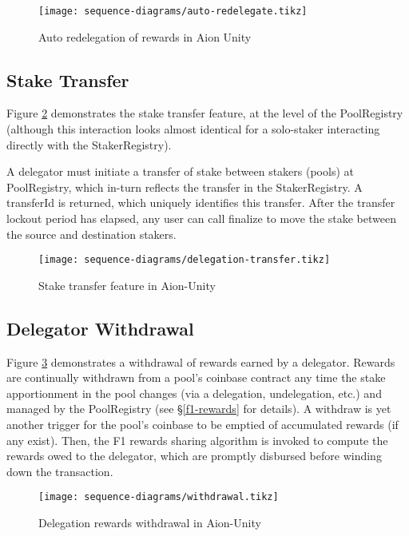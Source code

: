 \begin{figure}[ht]
\centering
\texttt{[image: sequence-diagrams/auto-redelegate.tikz]}
\caption{Auto redelegation of rewards in Aion Unity}
\label{fig:redelegation}
\end{figure}
\clearpage

\subsection{Stake Transfer}

Figure \ref{fig:delegation_transfer} demonstrates the stake transfer feature, at the level of the PoolRegistry (although this interaction looks almost identical for a solo-staker interacting directly with the StakerRegistry). 

A delegator must initiate a transfer of stake between stakers (pools) at PoolRegistry, which in-turn reflects the transfer in the StakerRegistry. A transferId is returned, which uniquely identifies this transfer. After the transfer lockout period has elapsed, any user can call finalize to move the stake between the source and destination stakers.

\begin{figure}[ht]
\centering
\texttt{[image: sequence-diagrams/delegation-transfer.tikz]}
\caption{Stake transfer feature in Aion-Unity}
\label{fig:delegation_transfer}
\end{figure}
\clearpage

\subsection{Delegator Withdrawal}

Figure \ref{fig:withdrawal} demonstrates a withdrawal of rewards earned by a delegator. Rewards are continually withdrawn from a pool's coinbase contract any time the stake apportionment in the pool changes (via a delegation, undelegation, etc.) and managed by the PoolRegistry (see \S\ref{f1-rewards} for details). A withdraw is yet another trigger for the pool's coinbase to be emptied of accumulated rewards (if any exist). Then, the F1 rewards sharing algorithm is invoked to compute the rewards owed to the delegator, which are promptly disbursed before winding down the transaction. 

\begin{figure}[ht]
\centering
\texttt{[image: sequence-diagrams/withdrawal.tikz]}
\caption{Delegation rewards withdrawal in Aion-Unity}
\label{fig:withdrawal}
\end{figure}
\clearpage